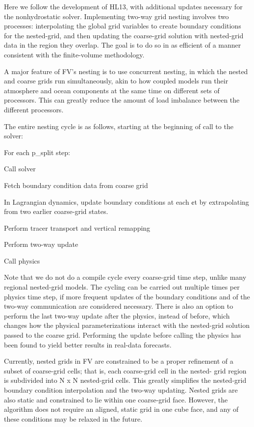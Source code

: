 Here we follow the development of H\+L13, with additional updates necessary for the nonhydrostatic solver. Implementing two-\/way grid nesting involves two processes\+: interpolating the global grid variables to create boundary conditions for the nested-\/grid, and then updating the coarse-\/grid solution with nested-\/grid data in the region they overlap. The goal is to do so in as efficient of a manner consistent with the finite-\/volume methodology.

A major feature of FV\textthreesuperior{}’s nesting is to use concurrent nesting, in which the nested and coarse grids run simultaneously, akin to how coupled models run their atmosphere and ocean components at the same time on different sets of processors. This can greatly reduce the amount of load imbalance between the different processors.

The entire nesting cycle is as follows, starting at the beginning of call to the solver\+:


\begin{DoxyItemize}
\item For each {\ttfamily p\+\_\+split} step\+:
\begin{DoxyItemize}
\item Call solver
\item Fetch boundary condition data from coarse grid
\item In Lagrangian dynamics, update boundary conditions at each ¢t by extrapolating from two earlier coarse-\/grid states.
\item Perform tracer transport and vertical remapping
\item Perform two-\/way update
\end{DoxyItemize}
\item Call physics
\end{DoxyItemize}

Note that we do not do a compile cycle every coarse-\/grid time step, unlike many regional nested-\/grid models. The cycling can be carried out multiple times per physics time step, if more frequent updates of the boundary conditions and of the two-\/way communication are considered necessary. There is also an option to perform the last two-\/way update after the physics, instead of before, which changes how the physical parameterizations interact with the nested-\/grid solution passed to the coarse grid. Performing the update before calling the physics has been found to yield better results in real-\/data forecasts.

Currently, nested grids in FV\textthreesuperior{} are constrained to be a proper refinement of a subset of coarse-\/grid cells; that is, each coarse-\/grid cell in the nested-\/ grid region is subdivided into N x N nested-\/grid cells. This greatly simplifies the nested-\/grid boundary condition interpolation and the two-\/way updating. Nested grids are also static and constrained to lie within one coarse-\/grid face. However, the algorithm does not require an aligned, static grid in one cube face, and any of these conditions may be relaxed in the future.

